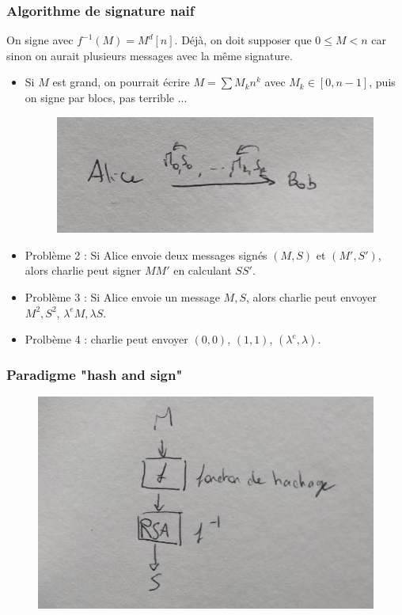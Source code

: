            \subsubsection{Algorithme de signature naif}
                On signe avec $f^{-1}(M) = M^d[n]$. Déjà, on doit supposer que $0 \leq M < n$ car sinon on aurait plusieurs messages avec la même signature.
                \begin{itemize}
                    \item Si $M$ est grand, on pourrait écrire $M = \sum M_kn^k$ avec $M_k \in [0, n-1]$, puis on signe par blocs, pas terrible ... 
                    \begin{figure}[H]
                        \centering
                        \includegraphics[width=.5\textwidth]{04}
                    \end{figure}
                    \item Problème 2 : Si Alice envoie deux messages signés $(M,S)$ et $(M',S')$, alors charlie peut signer $MM'$ en calculant $SS'$.
                    \item Problème 3 : Si Alice envoie un message $M,S$, alors charlie peut envoyer $M^2, S^2$, $\lambda^eM, \lambda S$.
                    \item Prolbème 4 : charlie peut envoyer $(0, 0)$, $(1, 1)$, $(\lambda^e, \lambda)$.
                \end{itemize}
                
            \subsubsection{Paradigme "hash and sign"}
                \begin{figure}[H]
                    \centering
                    \includegraphics[width=.5\textwidth]{05 }
                \end{figure}

